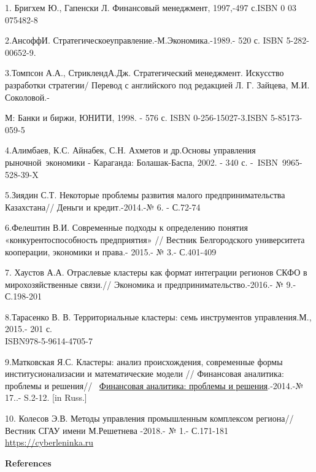 \begin{references}

1. Бригхем Ю., Гапенски Л. Финансовый менеджмент, 1997,-497 с.ISBN 0 03
075482-8

2.АнсоффИ. Стратегическоеуправление.-М.Экономика.-1989.- 520 с. ISBN
5-282-00652-9.

3.Томпсон А.А., СтриклендА.Дж. Стратегический менеджмент. Искусство
разработки стратегии/ Перевод с английского под редакцией Л. Г. Зайцева,
М.И. Соколовой.-

М: Банки и биржи, ЮНИТИ, 1998. - 576 с. ISBN 0-256-15027-3.ISBN
5-85173-059-5

4.Алимбаев, К.С. Айнабек, С.Н. Ахметов и др.Основы управления
рыночной~экономики - Караганда: Болашак-Баспа, 2002. - 340 с.
-~ISBN~9965-528-39-X

5.Зиядин С.Т. Некоторые проблемы развития малого предпринимательства
Казахстана// Деньги и кредит.-2014.-№ 6. - С.72-74

6.Фелештин В.И. Современные подходы к определению понятия
«конкурентоспособность предприятия» // Вестник Белгородского
университета кооперации, экономики и права.- 2015.- № 3.- С.401-409

7. Хаустов А.А. Отраслевые кластеры как формат интеграции регионов СКФО
в мирохозяйственные связи.// Экономика и предпринимательство.-2016.- №
9.- С.198-201

8.Тарасенко В. В. Территориальные кластеры: семь инструментов
управления.М., 2015.- 201 с. \\ISBN978-5-9614-4705-7

9.Матковская Я.С. Кластеры: анализ происхождения, современные формы
институсионализасии и математические модели // Финансовая аналитика:
проблемы и решения//
~\href{https://www.fin-izdat.ru/journal/fa/}{Финансовая аналитика:
проблемы и решения}.-2014.-№ 17..- S.2-12. [in Russ.]

10. Колесов Э.В. Методы управления промышленным комплексом региона//
Вестник СГАУ имени М.Решетнева -2018.- № 1.- С.171-181
\href{https://cyberleninka.ru/article/n/metody-upravleniya-promyshlennym-kompleksom-regiona}{https://cyberleninka.ru}
\end{references}

\begin{center}
{\bfseries References}
\end{center}

